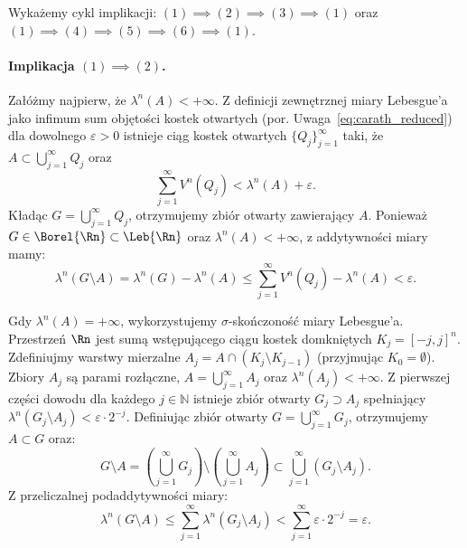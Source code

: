 \begin{dow}
    Wykażemy cykl implikacji: $(1) \implies (2) \implies (3) \implies (1)$ oraz $(1) \implies (4) \implies (5) \implies (6) \implies (1)$.

    \paragraph{Implikacja $(1) \implies (2)$.}
    Załóżmy najpierw, że $\lambda^n(A) < +\infty$. Z definicji zewnętrznej miary Lebesgue'a jako infimum sum objętości kostek otwartych (por. Uwaga~\ref{eq:carath_reduced}) dla dowolnego $\varepsilon > 0$ istnieje ciąg kostek otwartych $\{Q_j\}_{j=1}^\infty$ taki, że $A \subset \bigcup_{j=1}^\infty Q_j$ oraz
    \begin{equation*}
        \sum_{j=1}^\infty V^n(Q_j) < \lambda^n(A) + \varepsilon.
    \end{equation*}
    Kładąc $G = \bigcup_{j=1}^\infty Q_j$, otrzymujemy zbiór otwarty zawierający $A$. Ponieważ $G \in \Borel{\Rn} \subset \Leb{\Rn}$ oraz $\lambda^n(A) < +\infty$, z addytywności miary mamy:
    \begin{equation*}
        \lambda^n(G \setminus A) = \lambda^n(G) - \lambda^n(A) \le \sum_{j=1}^\infty V^n(Q_j) - \lambda^n(A) < \varepsilon.
    \end{equation*}

    Gdy $\lambda^n(A) = +\infty$, wykorzystujemy $\sigma$-skończoność miary Lebesgue'a. Przestrzeń $\Rn$ jest sumą wstępującego ciągu kostek domkniętych $K_j = [-j, j]^n$. Zdefiniujmy warstwy mierzalne $A_j = A \cap (K_j \setminus K_{j-1})$ (przyjmując $K_0 = \emptyset$). Zbiory $A_j$ są parami rozłączne, $A = \bigcup_{j=1}^\infty A_j$ oraz $\lambda^n(A_j) < +\infty$.
    Z pierwszej części dowodu dla każdego $j \in \mathbb{N}$ istnieje zbiór otwarty $G_j \supset A_j$ spełniający $\lambda^n(G_j \setminus A_j) < \varepsilon \cdot 2^{-j}$.
    Definiując zbiór otwarty $G = \bigcup_{j=1}^\infty G_j$, otrzymujemy $A \subset G$ oraz:
    \begin{equation*}
        G \setminus A = \left(\bigcup_{j=1}^\infty G_j\right) \setminus \left(\bigcup_{j=1}^\infty A_j\right) \subset \bigcup_{j=1}^\infty (G_j \setminus A_j).
    \end{equation*}
    Z przeliczalnej podaddytywności miary:
    \begin{equation*}
        \lambda^n(G \setminus A) \le \sum_{j=1}^\infty \lambda^n(G_j \setminus A_j) < \sum_{j=1}^\infty \varepsilon \cdot 2^{-j} = \varepsilon.
    \end{equation*}


\end{dow}
